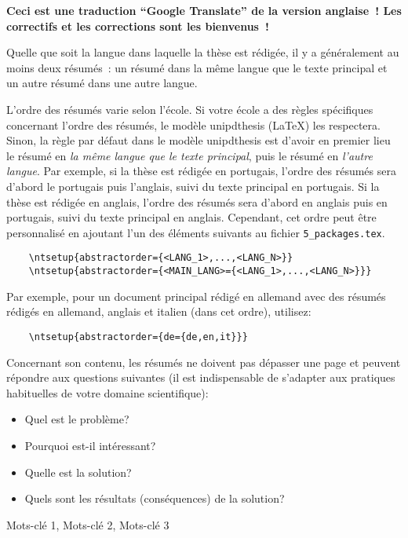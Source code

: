 
%

\textbf{Ceci est une traduction “Google Translate” de la version anglaise ! Les correctifs et les corrections sont les bienvenus !}

Quelle que soit la langue dans laquelle la thèse est rédigée, il y a généralement au moins deux résumés : un résumé dans la même langue que le texte principal et un autre résumé dans une autre langue.

L'ordre des résumés varie selon l'école. Si votre école a des règles spécifiques concernant l'ordre des résumés, le modèle \gls{unipdthesis} (\LaTeX) les respectera. Sinon, la règle par défaut dans le modèle \gls{unipdthesis} est d'avoir en premier lieu le résumé en \emph{la même langue que le texte principal}, puis le résumé en \emph{l'autre langue}. Par exemple, si la thèse est rédigée en portugais, l'ordre des résumés sera d'abord le portugais puis l'anglais, suivi du texte principal en portugais. Si la thèse est rédigée en anglais, l'ordre des résumés sera d'abord en anglais puis en portugais, suivi du texte principal en anglais.
%
Cependant, cet ordre peut être personnalisé en ajoutant l'un des éléments suivants au fichier \verb+5_packages.tex+.

\begin{verbatim}
    \ntsetup{abstractorder={<LANG_1>,...,<LANG_N>}}
    \ntsetup{abstractorder={<MAIN_LANG>={<LANG_1>,...,<LANG_N>}}}
\end{verbatim}

Par exemple, pour un document principal rédigé en allemand avec des résumés rédigés en allemand, anglais et italien (dans cet ordre), utilisez:
\begin{verbatim}
    \ntsetup{abstractorder={de={de,en,it}}}
\end{verbatim}

Concernant son contenu, les résumés ne doivent pas dépasser une page et peuvent répondre aux questions suivantes (il est indispensable de s'adapter aux pratiques habituelles de votre domaine scientifique):

\begin{itemize}
  \item Quel est le problème?
  \item Pourquoi est-il intéressant?
  \item Quelle est la solution?
  \item Quels sont les résultats (conséquences) de la solution?
\end{itemize}

\begin{keywords}
Mots-clé 1, Mots-clé 2, Mots-clé 3
\end{keywords}
